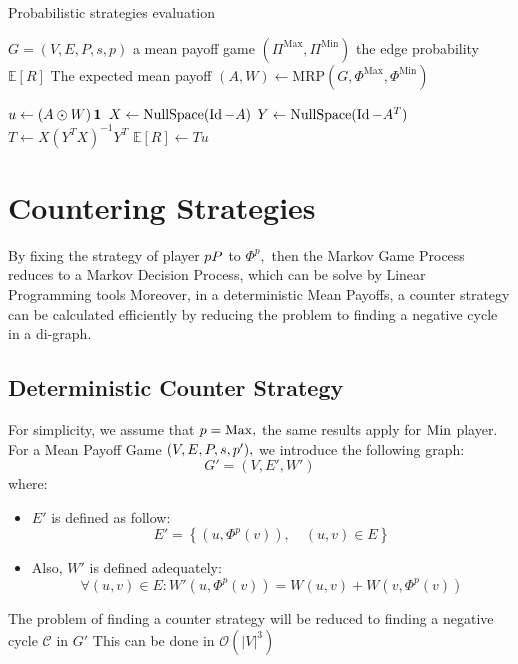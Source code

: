 \begin{algorithm}
	\caption{Probabilistic strategies evaluation}\label{alg:ProbabilisticEvaluation}
	\begin{algorithmic}
		\Require $G=(V,E,P,s,p)$ a mean payoff game
		\Require $(\Pi^{\text{Max}},\Pi^{\text{Min}})$ the edge probability 
		\Ensure $\mathbb{E}[R]$ The expected mean payoff  
		\State $(A,W)\leftarrow \text{MRP}(G,\Phi^{\text{Max}},\Phi^{\text{Min}})$
		
		\State $u\leftarrow (A\odot W)\operatorname{\mathbf{1}}$
		\State $X\leftarrow \text{NullSpace}(\operatorname{Id} - A)$ 
		\State $Y\leftarrow \text{NullSpace}(\operatorname{Id} - A^T)$ 
		\State $T \leftarrow X(Y^TX)^{-1}Y^T$ 
		\State \Return $\mathbb{E}[R]\leftarrow Tu$
	\end{algorithmic}
\end{algorithm}


\section{Countering Strategies}
By fixing the strategy of player $pP$ to $\Phi^p,$ then the Markov Game Process reduces to a Markov Decision Process, which can be solve by Linear Programming tools %
\newline Moreover, in a deterministic Mean Payoffs, a counter strategy can be calculated efficiently by reducing the problem to finding a negative cycle in a di-graph.
\subsection{Deterministic Counter Strategy}
For simplicity, we assume that $p=\operatorname{Max},$ the same results apply for $\operatorname{Min}$ player.
\newline For a Mean Payoff Game $(V,E,P,s,p'),$ we introduce the following graph:
$$
G'=\left(V,E',W'\right)
$$
where:
\begin{itemize}
	\item $E'$ is defined as follow:
	$$
	E'=\left\{(u,\Phi^p(v)),\quad (u,v)\in E\right\}
	$$
	\item Also, $W'$ is defined adequately:
	$$
	\forall (u,v)\in E: W'(u,\Phi^p(v))=W(u,v)+W(v,\Phi^p(v))
	$$
\end{itemize}	
The problem of finding a counter strategy will be reduced to finding a negative cycle $\mathcal{C}$ in $G'$
\newline This can be done in $\mathcal{O}(\lvert V\rvert^3)$
